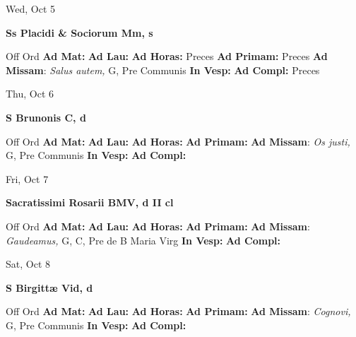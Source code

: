 \documentclass[10pt]{article}
\begin{document}
\begin{minipage}{3.5in}
\vspace{2em}\begin{center}
Wed, Oct 5
\end{center}\textbf{ \large Ss Placidi \& Sociorum Mm, \textnormal{\normalsize s}}
\begin{justify}
Off Ord
\textbf{Ad Mat: }
\textbf{Ad Lau: }
\textbf{Ad Horas: }Preces
\textbf{Ad Primam: }Preces
\textbf{Ad Missam}: \textit{Salus autem,} G, Pre Communis
\textbf{In Vesp: }
\textbf{Ad Compl: }Preces\end{justify}
\end{minipage}



\begin{minipage}{3.5in}
\vspace{2em}\begin{center}
Thu, Oct 6
\end{center}\textbf{ \large S Brunonis C, \textnormal{\normalsize d}}
\begin{justify}
Off Ord
\textbf{Ad Mat: }
\textbf{Ad Lau: }
\textbf{Ad Horas: }
\textbf{Ad Primam: }
\textbf{Ad Missam}: \textit{Os justi,} G, Pre Communis
\textbf{In Vesp: }
\textbf{Ad Compl: }\end{justify}
\end{minipage}



\begin{minipage}{3.5in}
\vspace{2em}\begin{center}
Fri, Oct 7
\end{center}\textbf{ \large Sacratissimi Rosarii BMV, \textnormal{\normalsize d II cl}}
\begin{justify}
Off Ord
\textbf{Ad Mat: }
\textbf{Ad Lau: }
\textbf{Ad Horas: }
\textbf{Ad Primam: }
\textbf{Ad Missam}: \textit{Gaudeamus,} G, C, Pre de B Maria Virg
\textbf{In Vesp: }
\textbf{Ad Compl: }\end{justify}
\end{minipage}



\begin{minipage}{3.5in}
\vspace{2em}\begin{center}
Sat, Oct 8
\end{center}\textbf{ \large S Birgittæ Vid, \textnormal{\normalsize d}}
\begin{justify}
Off Ord
\textbf{Ad Mat: }
\textbf{Ad Lau: }
\textbf{Ad Horas: }
\textbf{Ad Primam: }
\textbf{Ad Missam}: \textit{Cognovi,} G, Pre Communis
\textbf{In Vesp: }
\textbf{Ad Compl: }\end{justify}
\end{minipage}
\end{document}
